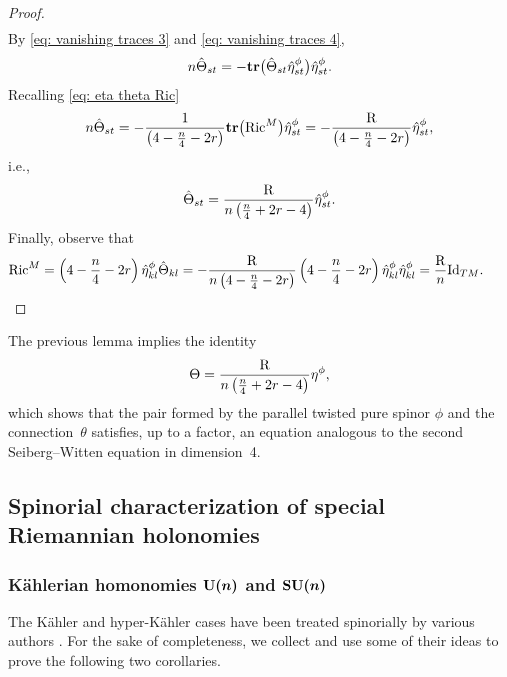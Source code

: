 \documentclass[pdftex]{sigma}
\newcommand{\tr}{\mbox{\bf tr}}
\numberwithin{equation}{section}
\begin{document}
\begin{proof}
\begin{gather*}
\end{gather*}
By \eqref{eq: vanishing traces 3} and \eqref{eq: vanishing traces 4},
\begin{gather*}
n\hat\Theta_{st} =-\tr\big(\hat\Theta_{st}\hat\eta_{st}^\phi\big)\hat\eta_{st}^\phi.
\end{gather*}
Recalling \eqref{eq: eta theta Ric}
\begin{gather*}
n\hat\Theta_{st} = -{1\over \left(4-{n\over 4}-2r\right)}\tr\big({\rm Ric}^M\big)\hat\eta_{st}^\phi=-{{\rm R}\over \left(4-{n\over 4}-2r\right)}\hat\eta_{st}^\phi,
\end{gather*}
i.e.,
\begin{gather*}
\hat\Theta_{st} = {{\rm R}\over n\left({n\over 4}+2r-4\right)}\hat\eta_{st}^\phi.
\end{gather*}
Finally, observe that
\begin{gather*}
{\rm Ric}^M = \left(4-{n\over 4}-2r\right) \hat\eta_{kl}^\phi\hat\Theta_{kl}=
-{{\rm R}\over n\left(4-{n\over 4}-2r\right)} \left(4-{n\over 4}-2r\right) \hat\eta_{kl}^\phi \hat\eta_{kl}^\phi =
{{\rm R}\over n} {\rm Id}_{TM}.\tag*{\qed}
\end{gather*}\renewcommand{\qed}{}
\end{proof}

\begin{Remark} The previous lemma implies the identity
\begin{gather}
\Theta ={{\rm R}\over n\left({n\over 4}+2r-4\right)}\eta^\phi,\label{eq: second equation}
\end{gather}
which shows that the pair formed by the parallel twisted pure spinor $\phi$ and the connec\-tion~$\theta$ satisfies, up to a factor, an equation analogous to the second Seiberg--Witten equation in dimension~4.
\end{Remark}

\subsection{Spinorial characterization of special Riemannian holonomies}
\subsubsection[K\"ahlerian homonomies ${\rm U}(n)$ and ${\rm SU}(n)$]{K\"ahlerian homonomies $\boldsymbol{{\rm U}(n)}$ and $\boldsymbol{{\rm SU}(n)}$}

The K\"ahler and hyper-K\"ahler cases have been treated spinorially by various authors \cite{Hitchin,Kirchberg, Lawson, Moroianu, Wang}. For the sake of completeness, we collect and use some of their ideas to prove the following two corollaries.
\end{document}
